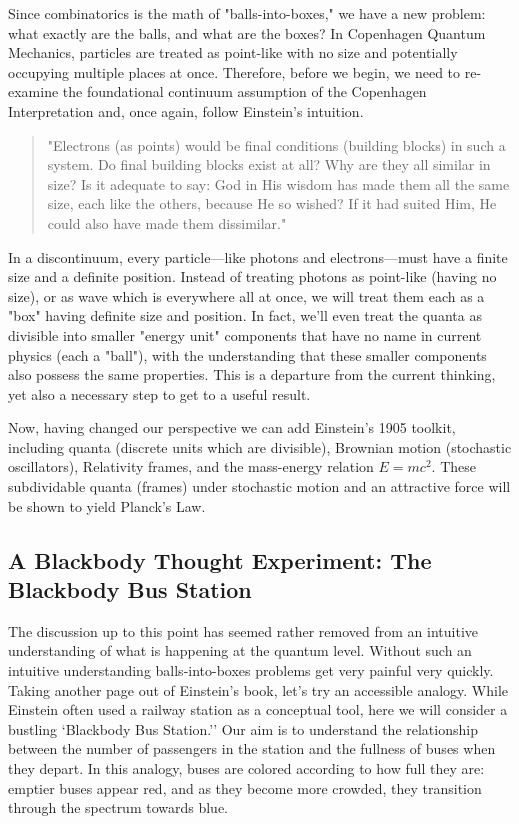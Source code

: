\documentclass{report}
\begin{document}
Since combinatorics is the math of "balls-into-boxes," we have a new problem: what exactly are the balls, and what are the boxes? In Copenhagen Quantum Mechanics, particles are treated as point-like with no size and potentially occupying multiple places at once. Therefore, before we begin, we need to re-examine the foundational continuum assumption of the Copenhagen Interpretation and, once again, follow Einstein's intuition.

\begin{quotation}
    "Electrons (as points) would be final conditions (building blocks) in such a system. Do final building blocks exist at all?  Why are they all similar in size? Is it adequate to say: God in His wisdom has made them all the same size, each like the others, because He so wished? If it had suited Him, He could also have made them dissimilar." \cite{Einstein314}
\end{quotation}

In a discontinuum, every particle—like photons and electrons—must have a finite size and a definite position. Instead of treating photons as point-like (having no size), or as wave which is everywhere all at once, we will treat them each as a "box" having definite size and position. In fact, we'll even treat the quanta as divisible into smaller "energy unit" components that have no name in current physics (each a "ball"), with the understanding that these smaller components also possess the same properties. This is a departure from the current thinking, yet also a necessary step to get to a useful result.

Now, having changed our perspective we can add Einstein's 1905 toolkit, including quanta (discrete units which are divisible), Brownian motion (stochastic oscillators), Relativity frames, and the mass-energy relation $E=mc^2$. These subdividable quanta (frames) under stochastic motion and an attractive force will be shown to yield Planck’s Law.


\subsection*{A Blackbody Thought Experiment: The Blackbody Bus Station}

The discussion up to this point has seemed rather removed from an intuitive understanding of what is happening at the quantum level. Without such an intuitive understanding balls-into-boxes problems get very painful very quickly. Taking another page out of Einstein's book, let's try an accessible analogy. While Einstein often used a railway station as a conceptual tool, here we will consider a bustling `Blackbody Bus Station.'' Our aim is to understand the relationship between the number of passengers in the station and the fullness of buses when they depart. In this analogy, buses are colored according to how full they are: emptier buses appear red, and as they become more crowded, they transition through the spectrum towards blue.
\end{document}
